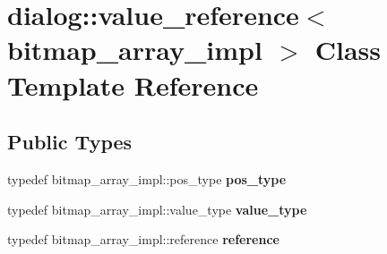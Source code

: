 \hypertarget{classdialog_1_1value__reference}{}\section{dialog\+:\+:value\+\_\+reference$<$ bitmap\+\_\+array\+\_\+impl $>$ Class Template Reference}
\label{classdialog_1_1value__reference}
\subsection*{Public Types}
\begin{DoxyCompactItemize}
\item 
\mbox{\label{classdialog_1_1value__reference_aed2730b545c6941ae0da3c70cfd070fd}} 
typedef bitmap\+\_\+array\+\_\+impl\+::pos\+\_\+type {\bfseries pos\+\_\+type}
\item 
\mbox{\label{classdialog_1_1value__reference_a2297761e03c254352701463638c28447}} 
typedef bitmap\+\_\+array\+\_\+impl\+::value\+\_\+type {\bfseries value\+\_\+type}
\item 
\mbox{\label{classdialog_1_1value__reference_a6c5b20eb5bc12a3ace9fd753da3d919f}} 
typedef bitmap\+\_\+array\+\_\+impl\+::reference {\bfseries reference}
\end{DoxyCompactItemize}
